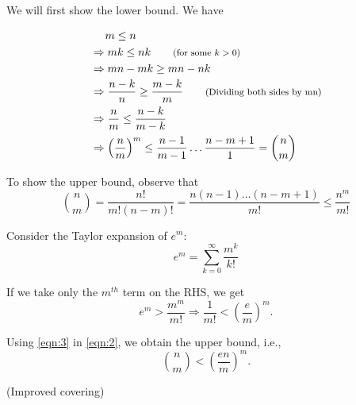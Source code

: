 \documentclass[11pt]{article}
\newenvironment{exercise}[2][Exercise]{\begin{trivlist}
\item[\hskip \labelsep {\bfseries #1}\hskip \labelsep {\bfseries #2.}]}{\end{trivlist}}
\newenvironment{solution}[1][Solution]{\begin{trivlist}
\item[\hskip \labelsep {\bfseries #1}\hskip \labelsep]}{\end{trivlist}}
\newcommand*{\annot}[1]{\tag*{\footnotesize{(#1)}}}
\begin{document}
\begin{solution}
We will first show the lower bound. We have

\begin{align*}
& ~~~~ m \leq n \\
&\Rightarrow mk \leq nk \annot{for some $k > 0$}\\
&\Rightarrow mn - mk \geq mn - nk \\
&\Rightarrow \frac{n - k}{n} \geq \frac{m - k}{m} \annot{Dividing both sides by mn}\\
&\Rightarrow \frac{n}{m} \leq \frac{n - k}{m - k} \\
&\Rightarrow \left( \frac{n}{m} \right)^m \leq \frac{n-1}{m-1} \ldots \frac{n-m+1}{1} = {n\choose m}\\ 
\end{align*}

To show the upper bound, observe that
\begin{equation}
{n \choose m} = \frac{n!}{m!(n-m)!} = \frac{n(n-1)\ldots(n-m+1)}{m!} \leq \frac{n^m}{m!}
\label{eqn:2}
\end{equation}

Consider the Taylor expansion of $e^m$:
\begin{equation*}
e^m = \sum_{k=0}^\infty \frac{m^k}{k!}
\end{equation*}

If we take only the $m^{th}$ term on the RHS, we get
\begin{equation}
e^m > \frac{m^m}{m!} \Rightarrow \frac{1}{m!} < \left( \frac{e}{m} \right)^m.
\label{eqn:3}
\end{equation}

Using \ref{eqn:3} in \ref{eqn:2}, we obtain the upper bound, i.e.,
\begin{equation*}
{n \choose m} < \left( \frac{en}{m} \right)^m.
\end{equation*}

\end{solution}

\begin{exercise}{0.1.6}(Improved covering)
\end{exercise}
\end{document}
